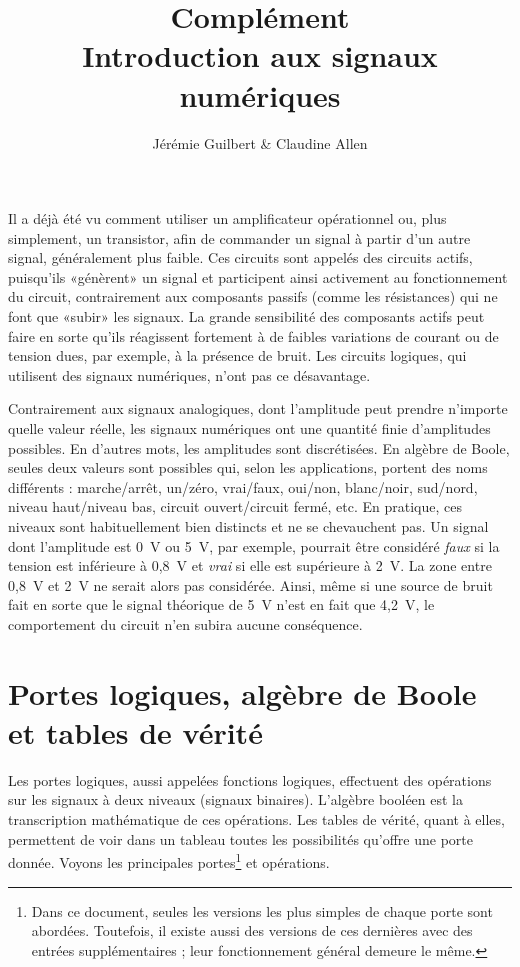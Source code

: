 \documentclass[canadien,12pt,oneside,letterpaper]{article}
\begin{document}
 
\title{\textbf{Complément}\\Introduction aux signaux numériques}
\author{Jérémie Guilbert \& Claudine Allen}
\date{}
\maketitle


Il a déjà été vu comment utiliser un amplificateur opérationnel ou, plus simplement, un transistor, afin de commander un signal à partir d'un autre signal, généralement plus faible. Ces circuits sont appelés des circuits actifs, puisqu'ils «génèrent» un signal et participent ainsi activement au fonctionnement du circuit, contrairement aux composants passifs (comme les résistances) qui ne font que «subir» les signaux. La grande sensibilité des composants actifs peut faire en sorte qu'ils réagissent fortement à de faibles variations de courant ou de tension dues, par exemple, à la présence de bruit. Les circuits logiques, qui utilisent des signaux numériques, n'ont pas ce désavantage.

Contrairement aux signaux analogiques, dont l'amplitude peut prendre n'importe quelle valeur réelle, les signaux numériques ont une quantité finie d'amplitudes possibles. En d'autres mots, les amplitudes sont discrétisées. En algèbre de Boole, seules deux valeurs sont possibles qui, selon les applications, portent des noms différents : marche/arrêt, un/zéro, vrai/faux, oui/non, blanc/noir, sud/nord, niveau haut/niveau bas, circuit ouvert/circuit fermé, etc. En pratique, ces niveaux sont habituellement bien distincts et ne se chevauchent pas. Un signal dont l'amplitude est 0~V ou 5~V, par exemple, pourrait être considéré \textit{faux} si la tension est inférieure à 0,8~V et \textit{vrai} si elle est supérieure à 2~V. La zone entre 0,8~V et 2~V ne serait alors pas considérée. Ainsi, même si une source de bruit fait en sorte que le signal théorique de 5~V n'est en fait que 4,2~V, le comportement du circuit n'en subira aucune conséquence.


\section{Portes logiques, algèbre de Boole et tables de vérité}

Les portes logiques, aussi appelées fonctions logiques, effectuent des opérations sur les signaux à deux niveaux (signaux binaires). L'algèbre booléen est la transcription mathématique de ces opérations. Les tables de vérité, quant à elles, permettent de voir dans un tableau toutes les possibilités qu'offre une porte donnée. Voyons les principales portes\footnote{Dans ce document, seules les versions les plus simples de chaque porte sont abordées. Toutefois, il existe aussi des versions de ces dernières avec des entrées supplémentaires ; leur fonctionnement général demeure le même.} et opérations.
\end{document}
